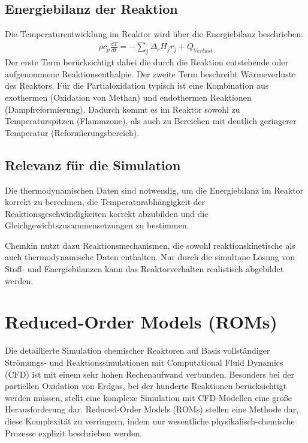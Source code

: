         \subsection{Energiebilanz der Reaktion}
            Die Temperaturentwicklung im Reaktor wird über die Energiebilanz beschrieben:
            \begin{align}
                \rho c_p \frac{dT}{dt} = -\sum_j\Delta_rH_jr_j + Q_{Verlust}
            \end{align}
            Der erste Term berücksichtigt dabei die durch die Reaktion entstehende oder aufgenommene Reaktionsenthalpie. Der zweite Term beschreibt Wärmeverluste des Reaktors. Für die Partialoxidation typisch ist eine Kombination aus exothermen (Oxidation von Methan) und endothermen Reaktionen (Dampfreformierung). Dadurch kommt es im Reaktor sowohl zu Temperaturspitzen (Flammzone), als auch zu Bereichen mit deutlich geringerer Temperatur (Reformierungsbereich). 
        \subsection{Relevanz für die Simulation}
            Die thermodynamischen Daten sind notwendig, um die Energiebilanz im Reaktor korrekt zu berechnen, die Temperaturabhängigkeit der Reaktionsgeschwindigkeiten korrekt abzubilden und die Gleichgewichtszusammensetzungen zu bestimmen.

            Chemkin nutzt dazu Reaktionsmechanismen, die sowohl reaktionskinetische als auch thermodynamische Daten enthalten. Nur durch die simultane Lösung von Stoff- und Energiebilanzen kann das Reaktorverhalten realistisch abgebildet werden.
    \section{Reduced-Order Models (ROMs)}
        Die detaillierte Simulation chemischer Reaktoren auf Basis vollständiger Strömungs- und Reaktionssimulationen mit Computational Fluid Dynamics (CFD) ist mit einem sehr hohen Rechenaufwand verbunden. Besonders bei der partiellen Oxidation von Erdgas, bei der hunderte Reaktionen berücksichtigt werden müssen, stellt eine komplexe Simulation mit CFD-Modellen eine große Herausforderung dar. Reduced-Order Models (ROMs) stellen eine Methode dar, diese Komplexität zu verringern, indem nur wesentliche physikalisch-chemische Prozesse explizit beschrieben werden.
        

